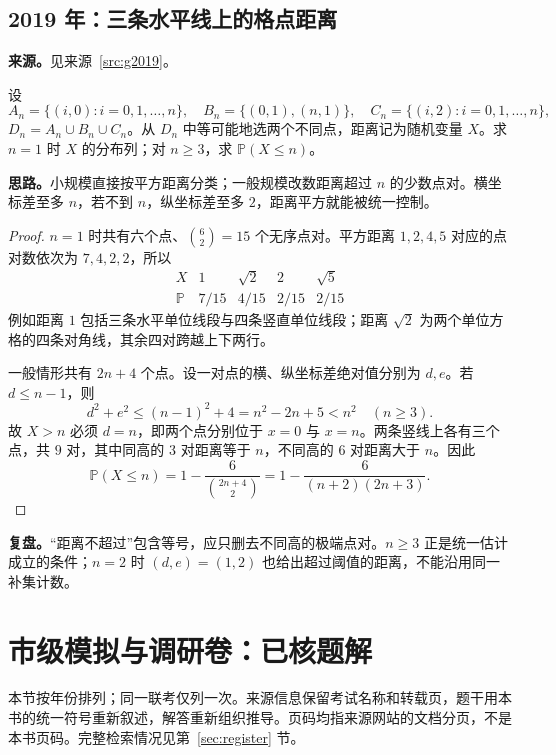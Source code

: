 \documentclass[UTF8]{ctexart}
\begin{document}
\subsection{2019 年：三条水平线上的格点距离}\label{sec:g2019}
\textbf{来源。}见来源~\ref{src:g2019}。
\begin{example}[题意重述]
设
\[
A_n=\{(i,0):i=0,1,\ldots,n\},\quad
B_n=\{(0,1),(n,1)\},\quad
C_n=\{(i,2):i=0,1,\ldots,n\},
\]
$D_n=A_n\cup B_n\cup C_n$。从 $D_n$ 中等可能地选两个不同点，距离记为随机变量 $X$。求 $n=1$ 时 $X$ 的分布列；对 $n\geq3$，求 $\mathbb P(X\leq n)$。
\end{example}
\textbf{思路。}小规模直接按平方距离分类；一般规模改数距离超过 $n$ 的少数点对。横坐标差至多 $n$，若不到 $n$，纵坐标差至多 $2$，距离平方就能被统一控制。
\begin{proof}
$n=1$ 时共有六个点、$\binom62=15$ 个无序点对。平方距离 $1,2,4,5$ 对应的点对数依次为 $7,4,2,2$，所以
\[
\begin{array}{c|cccc}
X&1&\sqrt2&2&\sqrt5\\\hline
\mathbb P&7/15&4/15&2/15&2/15
\end{array}
\]
例如距离 $1$ 包括三条水平单位线段与四条竖直单位线段；距离 $\sqrt2$ 为两个单位方格的四条对角线，其余四对跨越上下两行。

一般情形共有 $2n+4$ 个点。设一对点的横、纵坐标差绝对值分别为 $d,e$。若 $d\leq n-1$，则
\[
d^2+e^2\leq(n-1)^2+4=n^2-2n+5<n^2\quad(n\geq3).
\]
故 $X>n$ 必须 $d=n$，即两个点分别位于 $x=0$ 与 $x=n$。两条竖线上各有三个点，共 $9$ 对，其中同高的 $3$ 对距离等于 $n$，不同高的 $6$ 对距离大于 $n$。因此
\[
\boxed{\mathbb P(X\leq n)=1-\frac6{\binom{2n+4}{2}}
=1-\frac6{(n+2)(2n+3)}}.
\]
\end{proof}
\textbf{复盘。}“距离不超过”包含等号，应只删去不同高的极端点对。$n\geq3$ 正是统一估计成立的条件；$n=2$ 时 $(d,e)=(1,2)$ 也给出超过阈值的距离，不能沿用同一补集计数。

\section{市级模拟与调研卷：已核题解}\label{sec:city}
本节按年份排列；同一联考仅列一次。来源信息保留考试名称和转载页，题干用本书的统一符号重新叙述，解答重新组织推导。页码均指来源网站的文档分页，不是本书页码。完整检索情况见第~\ref{sec:register} 节。
\end{document}
